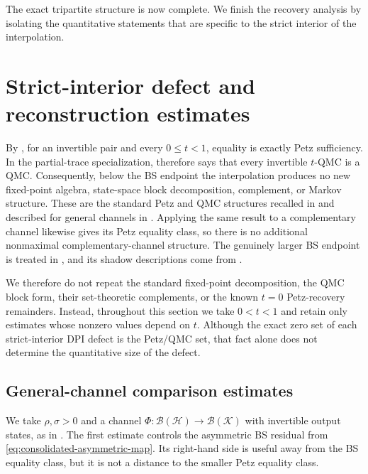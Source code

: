 \documentclass[11pt]{article}
\theoremstyle{remark}
\newcommand{\1}{\mathbbm{1}}
\begin{document}
The exact tripartite structure is now complete.  We finish the
recovery analysis by isolating the quantitative statements that are
specific to the strict interior of the interpolation.

\section{Strict-interior defect and reconstruction estimates}
\label{sec:consolidated-quantitative-reconstruction}

By , for an
invertible pair and every $0\leq t<1$, equality is exactly Petz
sufficiency.  In
the partial-trace specialization, 
therefore says that every invertible $t$-QMC is a QMC.  Consequently,
below the BS endpoint the interpolation produces no new fixed-point
algebra, state-space block decomposition, complement, or Markov
structure.  These are the standard Petz and QMC structures recalled
in  and described for general channels in
\cite[Theorems~3.18--3.19]{hiai2017different}.  Applying the same
result to a complementary channel likewise gives its Petz equality
class, so there is no additional nonmaximal complementary-channel
structure.  The genuinely larger BS endpoint is treated in
, and its shadow descriptions come from
\cite{Bluhm:2025kai}.

We therefore do not repeat the standard fixed-point decomposition,
the QMC block form, their set-theoretic complements, or the known
$t=0$ Petz-recovery remainders.  Instead, throughout this section we
take $0<t<1$ and retain only estimates whose nonzero values depend on
$t$.  Although the exact zero set of each strict-interior DPI defect
is the Petz/QMC set, that fact alone does not determine the
quantitative size of the defect.

\subsection{General-channel comparison estimates}

We take $\rho,\sigma>0$ and a channel
$\Phi:\mathcal B(\mathcal H)\to\mathcal B(\mathcal K)$
with invertible output states, as in .  The
first estimate controls the asymmetric BS residual from
\eqref{eq:consolidated-asymmetric-map}.  Its right-hand side is useful
away from the BS equality class, but it is not a distance to the
smaller Petz equality class.
\end{document}
